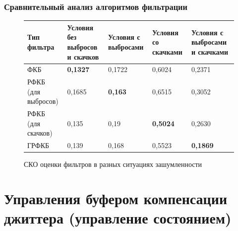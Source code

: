 \documentclass[10pt,pdf,hyperref={unicode}]{beamer}
\begin{document}
\begin{frame}
\frametitle{Сравнительный анализ алгоритмов фильтрации}
\begin{scriptsize}

\pgfplotsset{width=10cm, height=4cm, compat=newest}
\begin{figure} [!h]
  \center
{}
\caption*{СКО оценки фильтров в разных ситуациях зашумленности}


\begin{tabular}{|p{1.5cm}|p{1.5cm}|p{1.5cm}|p{1.5cm}|p{1.5cm}|}
    \hline
    Тип фильтра        & Условия без выбросов и скачков & Условия с выбросами & Условия со скачками  & Условия с выбросами и скачками \\ \hline
    ФКБ                 & \textbf{0,1327}                 & 0,1722                   & 0,6024                 & 0,2371                           \\ \hline
    РФКБ (для выбросов) & 0,1685                          &  \textbf{0,163}       & 0,6515                 & 0,3052                           \\ \hline
    РФКБ (для скачков)   & 0,135                           & 0,19               & \textbf{0,5024}                & 0,2630                             \\ \hline
    ГРФКБ               & 0,139                          & 0,168               &   0,5523            & \textbf{0,1869}                           \\ \hline
    \end{tabular}
\end{figure}
\end{scriptsize}
\end{frame}


\section{Управления буфером компенсации джиттера (управление состоянием)}
\end{document}
